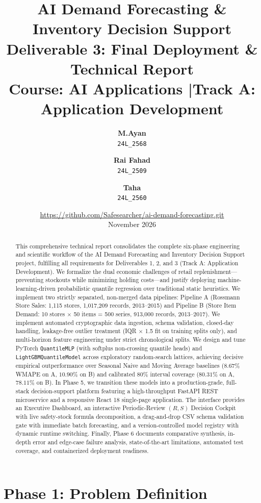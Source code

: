 \documentclass[11pt,a4paper]{article}
\title{\textbf{AI Demand Forecasting \& Inventory Decision Support}\\
	\large Deliverable 3: Final Deployment \& Technical Report\\
	\normalsize Course: AI Applications \quad|\quad Track A: Application Development}
\author{
	\textbf{M.Ayan} \\ \texttt{24L\_2568} \and
	\textbf{Rai Fahad} \\ \texttt{24L\_2509} \and
	\textbf{Taha} \\ \texttt{24L\_2560}
}
\date{
	\url{https://github.com/Safesearcher/ai-demand-forecasting.git} \\[0.5em]
	November 2026
}
\begin{document}
\maketitle

\begin{abstract}
This comprehensive technical report consolidates the complete six-phase engineering and scientific workflow of the AI Demand Forecasting and Inventory Decision Support project, fulfilling all requirements for Deliverables 1, 2, and 3 (Track A: Application Development). We formalize the dual economic challenges of retail replenishment---preventing stockouts while minimizing holding costs---and justify deploying machine-learning-driven probabilistic quantile regression over traditional static heuristics. We implement two strictly separated, non-merged data pipelines: Pipeline A (Rossmann Store Sales: 1,115 stores, 1,017,209 records, 2013--2015) and Pipeline B (Store Item Demand: 10 stores $\times$ 50 items = 500 series, 913,000 records, 2013--2017). We implement automated cryptographic data ingestion, schema validation, closed-day handling, leakage-free outlier treatment (IQR $\times$ 1.5 fit on training splits only), and multi-horizon feature engineering under strict chronological splits. We design and tune PyTorch \texttt{QuantileMLP} (with softplus non-crossing quantile heads) and \texttt{LightGBMQuantileModel} across exploratory random-search lattices, achieving decisive empirical outperformance over Seasonal Naive and Moving Average baselines ($8.67\%$ WMAPE on A, $10.90\%$ on B) and calibrated 80\% interval coverage ($80.31\%$ on A, $78.11\%$ on B). In Phase 5, we transition these models into a production-grade, full-stack decision-support platform featuring a high-throughput FastAPI REST microservice and a responsive React 18 single-page application. The interface provides an Executive Dashboard, an interactive Periodic-Review $(R, S)$ Decision Cockpit with live safety-stock formula decomposition, a drag-and-drop CSV schema validation gate with immediate batch forecasting, and a version-controlled model registry with dynamic runtime switching. Finally, Phase 6 documents comparative synthesis, in-depth error and edge-case failure analysis, state-of-the-art limitations, automated test coverage, and containerized deployment readiness.
\end{abstract}

\tableofcontents

\newpage

\section{Phase 1: Problem Definition}
\end{document}
